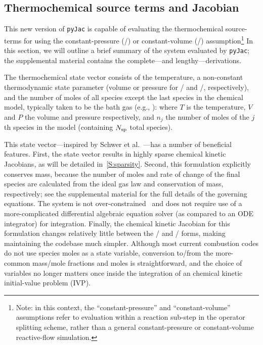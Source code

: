 \documentclass[12pt,number,sort&compress,preprint]{elsarticle}
\begin{document}
\subsection{Thermochemical source terms and Jacobian}
This new version of \texttt{pyJac} is capable of evaluating the thermochemical source-terms for using the constant-pressure (\conp/) or constant-volume (\conv/) assumption\footnote{Note: in this context, the ``constant-pressure'' and ``constant-volume'' assumptions refer to evaluation within a reaction sub-step in the operator splitting scheme, rather than a general constant-pressure or constant-volume reactive-flow simulation.}
In this section, we will outline a brief summary of the system evaluated by \texttt{pyJac}; the supplemental material contains the complete---and lengthy---derivations.


The thermochemical state vector consists of the temperature, a non-constant thermodynamic state parameter (volume or pressure for \conp/ and \conv/, respectively), and the number of moles of all species except the last species in the chemical model, typically taken to be the bath gas (e.g., ):
where $T$ is the temperature, $V$ and $P$ the volume and pressure respectively, and $n_j$ the number of moles of the $j$th species in the model (containing $\ns/$ total species).

This state vector---inspired by Schwer et al.~\cite{SCHWER2002270}---has a number of beneficial features.
First, the state vector results in highly sparse chemical kinetic Jacobians, as will be detailed in~\cref{S:sparsity}.
Second, this formulation explicitly conserves mass, because the number of moles and rate of change of the final species are calculated from the ideal gas law and conservation of mass, respectively; see the supplemental material for the full details of the governing equations.
The system is not over-constrained~\cite{HANSEN2018257} and does not require use of a more-complicated differential algebraic equation solver (as compared to an ODE integrator) for integration.
Finally, the chemical kinetic Jacobian for this formulation changes relatively little between the \conp/ and \conv/ forms, making maintaining the codebase much simpler.
Although most current combustion codes do not use species moles as a state variable, conversion to\slash from the more-common mass\slash mole fractions and moles is straightforward, and the choice of variables no longer matters once inside the integration of an chemical kinetic initial-value problem (IVP).
\end{document}
